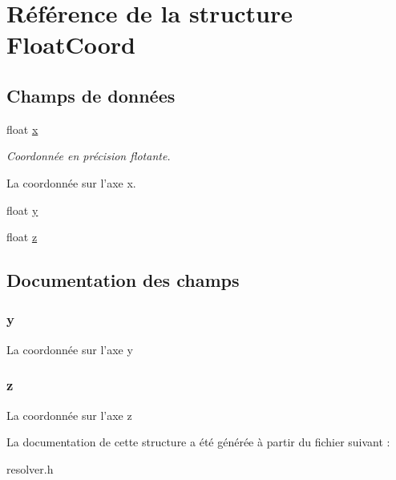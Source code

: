 \hypertarget{struct_float_coord}{\section{Référence de la structure Float\-Coord}
\label{struct_float_coord}
}
\subsection*{Champs de données}
\begin{DoxyCompactItemize}
\item 
float \hyperlink{group___resolver_ga9336ebf25087d91c818ee6e9ec29f8c1}{x}
\begin{DoxyCompactList}\small\item\em Coordonnée en précision flotante.

La coordonnée sur l'axe x. \end{DoxyCompactList}\item 
float \hyperlink{struct_float_coord_a2fb1c5cf58867b5bbc9a1b145a86f3a0}{y}
\item 
float \hyperlink{struct_float_coord_a25ed1bcb423b0b7200f485fc5ff71c8e}{z}
\end{DoxyCompactItemize}


\subsection{Documentation des champs}
\hypertarget{struct_float_coord_a2fb1c5cf58867b5bbc9a1b145a86f3a0}{
\subsubsection[{y}]{\setlength{\rightskip}{0pt plus 5cm}y}}\label{struct_float_coord_a2fb1c5cf58867b5bbc9a1b145a86f3a0}
La coordonnée sur l'axe y \hypertarget{struct_float_coord_a25ed1bcb423b0b7200f485fc5ff71c8e}{
\subsubsection[{z}]{\setlength{\rightskip}{0pt plus 5cm}z}}\label{struct_float_coord_a25ed1bcb423b0b7200f485fc5ff71c8e}
La coordonnée sur l'axe z 

La documentation de cette structure a été générée à partir du fichier suivant \-:\begin{DoxyCompactItemize}
\item 
resolver.\-h\end{DoxyCompactItemize}
